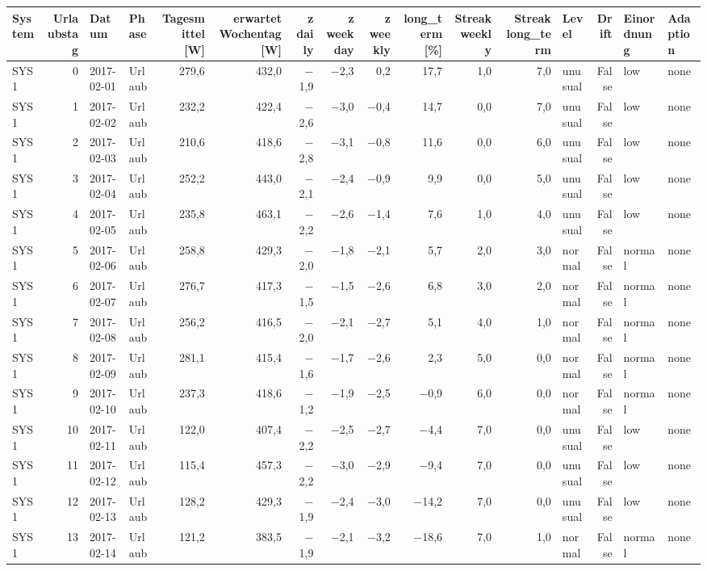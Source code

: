 \begin{tabular}{lrllrrrrrrrrlrll}
\toprule
System & Urlaubstag & Datum & Phase & Tagesmittel [W] & erwartet Wochentag [W] & z daily & z weekday & z weekly & long\_term [\%] & Streak weekly & Streak long\_term & Level & Drift & Einordnung & Adaption \\
\midrule
SYS1 & 0 & 2017-02-01 & Urlaub & 279,6 & 432,0 & $-$1,9 & $-$2,3 & 0,2 & 17,7 & 1,0 & 7,0 & unusual & False & low & none \\
SYS1 & 1 & 2017-02-02 & Urlaub & 232,2 & 422,4 & $-$2,6 & $-$3,0 & $-$0,4 & 14,7 & 0,0 & 7,0 & unusual & False & low & none \\
SYS1 & 2 & 2017-02-03 & Urlaub & 210,6 & 418,6 & $-$2,8 & $-$3,1 & $-$0,8 & 11,6 & 0,0 & 6,0 & unusual & False & low & none \\
SYS1 & 3 & 2017-02-04 & Urlaub & 252,2 & 443,0 & $-$2,1 & $-$2,4 & $-$0,9 & 9,9 & 0,0 & 5,0 & unusual & False & low & none \\
SYS1 & 4 & 2017-02-05 & Urlaub & 235,8 & 463,1 & $-$2,2 & $-$2,6 & $-$1,4 & 7,6 & 1,0 & 4,0 & unusual & False & low & none \\
SYS1 & 5 & 2017-02-06 & Urlaub & 258,8 & 429,3 & $-$2,0 & $-$1,8 & $-$2,1 & 5,7 & 2,0 & 3,0 & normal & False & normal & none \\
SYS1 & 6 & 2017-02-07 & Urlaub & 276,7 & 417,3 & $-$1,5 & $-$1,5 & $-$2,6 & 6,8 & 3,0 & 2,0 & normal & False & normal & none \\
SYS1 & 7 & 2017-02-08 & Urlaub & 256,2 & 416,5 & $-$2,0 & $-$2,1 & $-$2,7 & 5,1 & 4,0 & 1,0 & normal & False & normal & none \\
SYS1 & 8 & 2017-02-09 & Urlaub & 281,1 & 415,4 & $-$1,6 & $-$1,7 & $-$2,6 & 2,3 & 5,0 & 0,0 & normal & False & normal & none \\
SYS1 & 9 & 2017-02-10 & Urlaub & 237,3 & 418,6 & $-$1,2 & $-$1,9 & $-$2,5 & $-$0,9 & 6,0 & 0,0 & normal & False & normal & none \\
SYS1 & 10 & 2017-02-11 & Urlaub & 122,0 & 407,4 & $-$2,2 & $-$2,5 & $-$2,7 & $-$4,4 & 7,0 & 0,0 & unusual & False & low & none \\
SYS1 & 11 & 2017-02-12 & Urlaub & 115,4 & 457,3 & $-$2,2 & $-$3,0 & $-$2,9 & $-$9,4 & 7,0 & 0,0 & unusual & False & low & none \\
SYS1 & 12 & 2017-02-13 & Urlaub & 128,2 & 429,3 & $-$1,9 & $-$2,4 & $-$3,0 & $-$14,2 & 7,0 & 0,0 & unusual & False & low & none \\
SYS1 & 13 & 2017-02-14 & Urlaub & 121,2 & 383,5 & $-$1,9 & $-$2,1 & $-$3,2 & $-$18,6 & 7,0 & 1,0 & normal & False & normal & none \\

\end{tabular}
